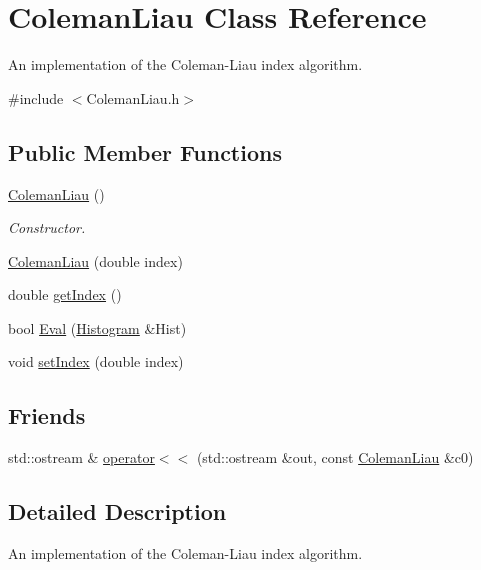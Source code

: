 \hypertarget{class_coleman_liau}{}\section{Coleman\+Liau Class Reference}
\label{class_coleman_liau}


An implementation of the Coleman-\/\+Liau index algorithm.  




{\ttfamily \#include $<$Coleman\+Liau.\+h$>$}

\subsection*{Public Member Functions}
\begin{DoxyCompactItemize}
\item 
\hyperlink{class_coleman_liau_a4ff77aa5f5ff81d167a8cabad71e620f}{Coleman\+Liau} ()
\begin{DoxyCompactList}\small\item\em Constructor. \end{DoxyCompactList}\item 
\hyperlink{class_coleman_liau_a0b46f263a2dd687c2fa89bbef88002d0}{Coleman\+Liau} (double index)
\item 
double \hyperlink{class_coleman_liau_a3a9e5cb64586313a753211c350147cb3}{get\+Index} ()
\item 
bool \hyperlink{class_coleman_liau_af0b2de26e53db82cb3e7243de1f26a6f}{Eval} (\hyperlink{class_histogram}{Histogram} \&Hist)
\item 
void \hyperlink{class_coleman_liau_a077d1533dfd8145ed729531c6edbfad0}{set\+Index} (double index)
\end{DoxyCompactItemize}
\subsection*{Friends}
\begin{DoxyCompactItemize}
\item 
std\+::ostream \& \hyperlink{class_coleman_liau_a896867aacd954df4faecc74a7010a8b0}{operator$<$$<$} (std\+::ostream \&out, const \hyperlink{class_coleman_liau}{Coleman\+Liau} \&c0)
\end{DoxyCompactItemize}


\subsection{Detailed Description}
An implementation of the Coleman-\/\+Liau index algorithm. 

